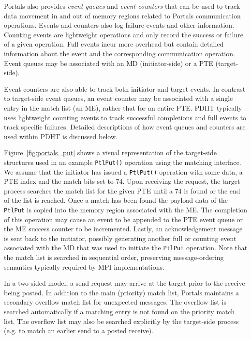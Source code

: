 Portals also provides {\em event queues} and {\em event counters} that can be
used to track data movement in and out of memory regions related to Portals
communication operations. Events and counters also log failure events and other
information. Counting events are lightweight operations and only record the
success or failure of a given operation. Full events incur more overhead but
contain detailed information about the event and the corresponding
communication operation. Event queues may be associated with an MD
(initiator-side) or a PTE (target-side). 

Event counters are also able to track both initiator and target events. In
contrast to target-side event queues, an event counter may be associated with a
single entry in the match list (an ME), rather that for an entire PTE. PDHT
typically uses lightweight counting events to track successful completions and
full events to track specific failures. Detailed descriptions of how event
queues and counters are used within PDHT is discussed below.

Figure~\ref{fig:portals_put} shows a visual representation of the target-side
structures used in an example {\tt PtlPut()} operation using the matching
interface. We assume that the initiator has issued a {\tt PtlPut()} operation
with some data, a PTE index and the match bits set to 74. Upon receiving the
request, the target process searches the match list for the given PTE until a
74 is found or the end of the list is reached. Once a match has been found the
payload data of the {\tt PtlPut} is copied into the memory region associated
with the ME. The completion of this operation may cause an event to be appended
to the PTE event queue or the ME success counter to be incremented. 
Lastly, an acknowledgement message is sent back to the initiator, possibly
generating another full or counting event associated with the MD that
was used to initiate the {\tt PtlPut} operation. Note that the match list is 
searched in sequential order, preserving message-ordering semantics
typically required by MPI implementations.

In a two-sided model, a send request may arrive at the target prior to the
receive being posted. In addition to the main (priority) match list, Portals
maintains a secondary overflow match list for unexpected messages.  The
overflow list is searched automatically if a matching entry is not found on the
priority match list. The overflow list may also be searched explicitly by
the target-side process (e.g. to match an earlier send to a posted receive).


